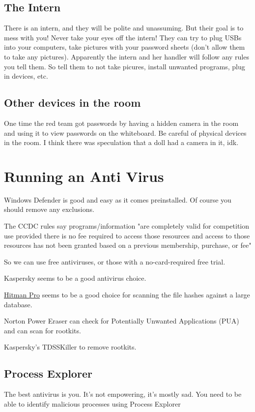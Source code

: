 \documentclass{article}
\begin{document}
\subsection{The Intern}
There is an intern, and they will be polite and unassuming. But their goal is to mess with you! Never take your eyes off the intern!
They can try to plug USBs into your computers, take pictures with your password sheets (don't allow them to take any pictures).
Apparently the intern and her handler will follow any rules you tell them. So tell them to not take picures, install unwanted programs, plug in devices, etc.

\subsection{Other devices in the room}
One time the red team got passwords by having a hidden camera in the room and using it to view passwords on the whiteboard. 
Be careful of physical devices in the room. I think there was speculation that a doll had a camera in it, idk.

\section{Running an Anti Virus}
Windows Defender is good and easy as it comes preinstalled. Of course you should remove any exclusions.

The CCDC rules say programs/information "are completely valid for competition use provided there is no 
fee required to access those resources and access to 
those resources has not been granted based on a previous membership, purchase, or fee"

So we can use free antiviruses, or those with a no-card-required free trial.

Kaspersky seems to be a good antivirus choice.

\href{https://www.sophos.com/en-us/free-tools/hitmanpro}{Hitman Pro} seems to be a good choice for scanning the file hashes against a large database.

Norton Power Eraser can check for Potentially Unwanted Applications (PUA) and can scan for rootkits.

Kaspersky's TDSSKiller to remove rootkits.

\subsection{Process Explorer}
The best antivirus is you. It's not empowering, it's mostly sad.
You need to be able to identify malicious processes using Process Explorer
\end{document}
